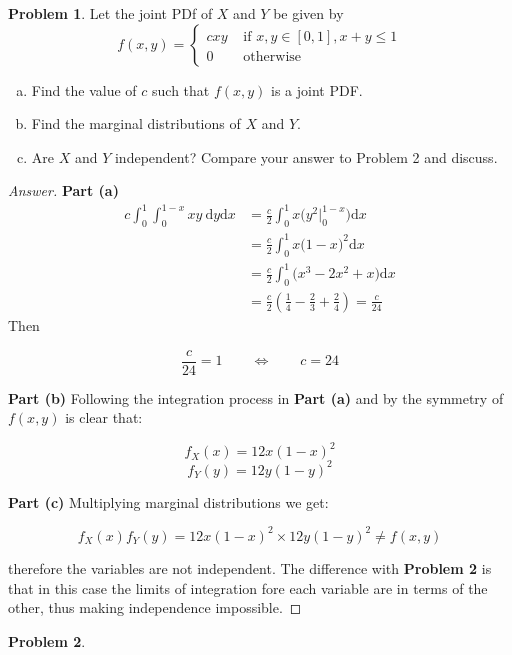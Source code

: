\documentclass{article}
\theoremstyle{definition}
\newtheorem{problem}{Problem}
\newcommand{\qiffq}{\qquad \iff \qquad}
\begin{document}
\begin{problem}
Let the joint PDf of $X$ and $Y$ be given by
$$
f(x, y)=\left\{\begin{array}{ll}
c x y & \text { if } x, y \in[0,1], x+y \leq 1 \\
0 & \text { otherwise }
\end{array}\right.
$$
\begin{enumerate}[(a)]
    \item Find the value of $c$ such that $f(x, y)$ is a joint PDF.
    \item Find the marginal distributions of $X$ and $Y$.
    \item Are $X$ and $Y$ independent? Compare your answer to Problem 2 and discuss.
\end{enumerate}

\end{problem}

\begin{proof}[Answer]
\textbf{Part (a)}
\begin{align*}
    c\int_{0}^1\int_{0}^{1-x}xy\:\mathrm{d}y\mathrm{d}x &= \frac{c}{2}\int_{0}^1x\big(y^2|_0^{1-x}\big)\mathrm{d} x \\
    &= \frac{c}{2}\int_{0}^1x\big(1-x\big)^2\mathrm{d}x \\
    &= \frac{c}{2}\int_{0}^1\big(x^3-2x^2+x\big)\mathrm{d}x \\
&= \frac{c}{2}\left(\frac{1}{4}-\frac{2}{3}+\frac{2}{4} \right) = \frac{c}{24}
\end{align*}
Then

$$\frac{c}{24}=1 \qiffq \boxed{c = 24}$$

\textbf{Part (b)}
Following the integration process in \textbf{Part (a)} and by the symmetry of $f(x,y)$ is clear that:

$$f_X(x) = 12 x(1-x)^2$$
$$f_Y(y) = 12 y(1-y)^2$$

\textbf{Part (c)}
Multiplying marginal distributions we get:

$$f_X(x)f_Y(y) = 12 x(1-x)^2\times 12 y(1-y)^2 \neq f(x,y)$$

therefore the variables are not independent. The difference with \textbf{Problem 2} is that in this case the limits of integration fore each variable are in terms of the other, thus making independence impossible.

\end{proof}

\begin{problem}
\end{problem}
\end{document}
